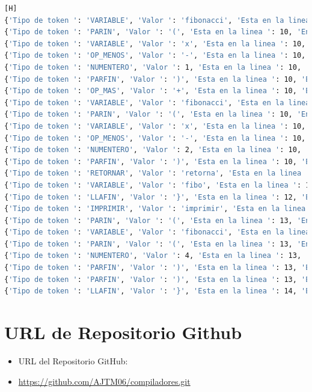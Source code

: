 \documentclass{article}
\begin{document}
\begin{lstlisting}[language=bash,caption={Tokens de Fibonacci}][H]
{'Tipo de token ': 'VARIABLE', 'Valor ': 'fibonacci', 'Esta en la linea ': 10, 'En la posición ': 142}
{'Tipo de token ': 'PARIN', 'Valor ': '(', 'Esta en la linea ': 10, 'En la posición ': 151}
{'Tipo de token ': 'VARIABLE', 'Valor ': 'x', 'Esta en la linea ': 10, 'En la posición ': 152}
{'Tipo de token ': 'OP_MENOS', 'Valor ': '-', 'Esta en la linea ': 10, 'En la posición ': 153}
{'Tipo de token ': 'NUMENTERO', 'Valor ': 1, 'Esta en la linea ': 10, 'En la posición ': 154}
{'Tipo de token ': 'PARFIN', 'Valor ': ')', 'Esta en la linea ': 10, 'En la posición ': 155}
{'Tipo de token ': 'OP_MAS', 'Valor ': '+', 'Esta en la linea ': 10, 'En la posición ': 157}
{'Tipo de token ': 'VARIABLE', 'Valor ': 'fibonacci', 'Esta en la linea ': 10, 'En la posición ': 159}
{'Tipo de token ': 'PARIN', 'Valor ': '(', 'Esta en la linea ': 10, 'En la posición ': 168}
{'Tipo de token ': 'VARIABLE', 'Valor ': 'x', 'Esta en la linea ': 10, 'En la posición ': 169}
{'Tipo de token ': 'OP_MENOS', 'Valor ': '-', 'Esta en la linea ': 10, 'En la posición ': 170}
{'Tipo de token ': 'NUMENTERO', 'Valor ': 2, 'Esta en la linea ': 10, 'En la posición ': 171}
{'Tipo de token ': 'PARFIN', 'Valor ': ')', 'Esta en la linea ': 10, 'En la posición ': 172}
{'Tipo de token ': 'RETORNAR', 'Valor ': 'retorna', 'Esta en la linea ': 11, 'En la posición ': 182}
{'Tipo de token ': 'VARIABLE', 'Valor ': 'fibo', 'Esta en la linea ': 11, 'En la posición ': 190}
{'Tipo de token ': 'LLAFIN', 'Valor ': '}', 'Esta en la linea ': 12, 'En la posición ': 199}
{'Tipo de token ': 'IMPRIMIR', 'Valor ': 'imprimir', 'Esta en la linea ': 13, 'En la posición ': 201}
{'Tipo de token ': 'PARIN', 'Valor ': '(', 'Esta en la linea ': 13, 'En la posición ': 209}
{'Tipo de token ': 'VARIABLE', 'Valor ': 'fibonacci', 'Esta en la linea ': 13, 'En la posición ': 210}
{'Tipo de token ': 'PARIN', 'Valor ': '(', 'Esta en la linea ': 13, 'En la posición ': 219}
{'Tipo de token ': 'NUMENTERO', 'Valor ': 4, 'Esta en la linea ': 13, 'En la posición ': 220}
{'Tipo de token ': 'PARFIN', 'Valor ': ')', 'Esta en la linea ': 13, 'En la posición ': 221}
{'Tipo de token ': 'PARFIN', 'Valor ': ')', 'Esta en la linea ': 13, 'En la posición ': 222}
{'Tipo de token ': 'LLAFIN', 'Valor ': '}', 'Esta en la linea ': 14, 'En la posición ': 224}
\end{lstlisting}





\section{URL de Repositorio Github}
    \begin{itemize}
    \item URL del Repositorio GitHub:
		\item \url{https://github.com/AJTM06/compiladores.git}
	\end{itemize}
\end{document}
